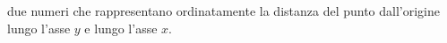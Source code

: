 due numeri che rappresentano ordinatamente la distanza del punto
dall'origine lungo l'asse $y$ e lungo l'asse $x$.